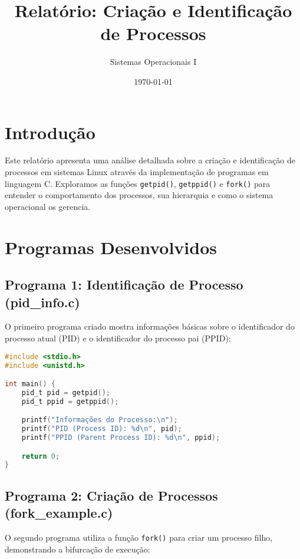 \documentclass[a4paper,11pt]{article}
\title{\textbf{Relatório: Criação e Identificação de Processos}}
\author{Sistemas Operacionais I}
\date{\today}
\begin{document}
\maketitle
\tableofcontents
\newpage

\section{Introdução}

Este relatório apresenta uma análise detalhada sobre a criação e identificação de processos em sistemas Linux através da implementação de programas em linguagem C. Exploramos as funções \texttt{getpid()}, \texttt{getppid()} e \texttt{fork()} para entender o comportamento dos processos, sua hierarquia e como o sistema operacional os gerencia.

\section{Programas Desenvolvidos}

\subsection{Programa 1: Identificação de Processo (pid\_info.c)}

O primeiro programa criado mostra informações básicas sobre o identificador do processo atual (PID) e o identificador do processo pai (PPID):

\begin{lstlisting}[language=C, caption=Programa pid\_info.c]
#include <stdio.h>
#include <unistd.h>

int main() {
    pid_t pid = getpid();
    pid_t ppid = getppid();

    printf("Informações do Processo:\n");
    printf("PID (Process ID): %d\n", pid);
    printf("PPID (Parent Process ID): %d\n", ppid);

    return 0;
}
\end{lstlisting}

\subsection{Programa 2: Criação de Processos (fork\_example.c)}

O segundo programa utiliza a função \texttt{fork()} para criar um processo filho, demonstrando a bifurcação de execução:
\end{document}
